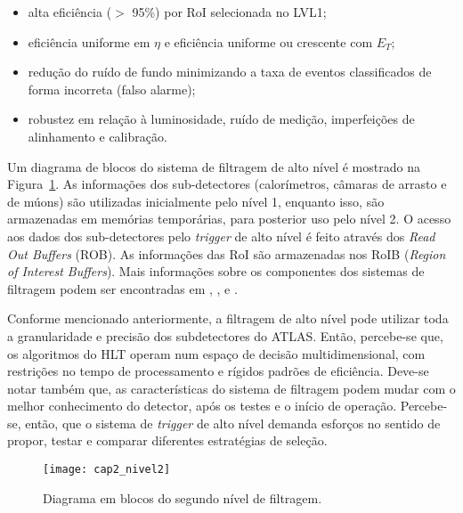 
\begin{itemize}
  \item alta eficiência ($>$ 95\%) por RoI selecionada no LVL1;

  \item eficiência uniforme em $\eta$ e eficiência uniforme ou
  crescente com $E_T$;

  \item redução do ruído de fundo minimizando a taxa de eventos classificados de forma incorreta (falso
  alarme);

  \item robustez em relação à luminosidade, ruído de medição, imperfeições de ali\-nha\-men\-to e calibração.

\end{itemize}

Um diagrama de blocos do sistema de filtragem de alto nível é
mostrado na Figura~\ref{lvl2}. As informações dos sub-detectores
(calorímetros, câmaras de arrasto e de múons) são utilizadas
inicialmente pelo nível 1, enquanto isso, são armazenadas em
memórias temporárias, para posterior uso pelo nível 2. O acesso aos
dados dos sub-detectores pelo \textit{trigger} de alto nível é feito
através dos \textit{Read Out Buffers} (ROB). As informações das RoI
são armazenadas nos RoIB (\textit{Region of Interest Buffers}). Mais
informações sobre os componentes dos sistemas de filtragem podem ser
encontradas em \cite{TDR:ATLAS:1998}, \cite{TDR:ATLAS:2003},
\cite{TDR1:ATLAS:1999} e \cite{TDR2:ATLAS:1999}.


Conforme mencionado anteriormente, a filtragem de alto nível pode
utilizar toda a granularidade e precisão dos subdetectores do ATLAS.
Então, percebe-se que, os algoritmos do HLT operam num espaço de
decisão multidimensional, com restrições no tempo de processamento e
rígidos padrões de eficiência. Deve-se notar também que, as
características do sistema de filtragem podem mudar com o melhor
conhe\-ci\-men\-to do detector, após os testes e o início de
operação. Percebe-se, então, que o sistema de \textit{trigger} de
alto nível demanda esforços no sentido de propor, testar e comparar
diferentes estratégias de seleção.

\begin{figure}[t!]
\centering
\texttt{[image: cap2\_nivel2]}
\caption{Diagrama em blocos do segundo nível de filtragem.}
\label{lvl2}
\end{figure}

